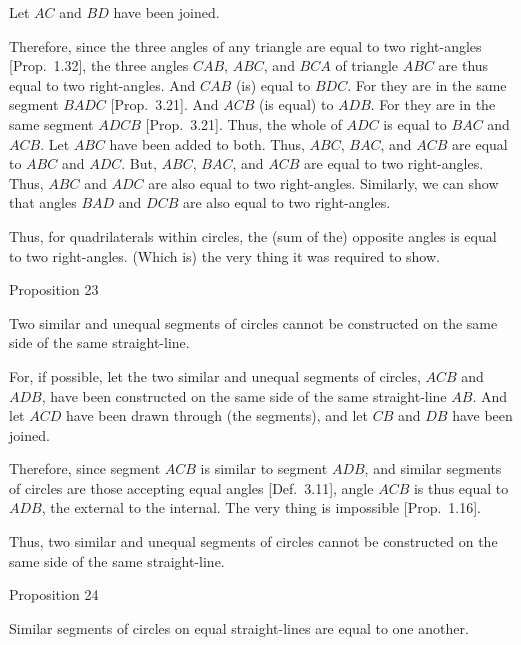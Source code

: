 Let $AC$ and $BD$ have been joined.

Therefore, since the three angles of any triangle are equal to two
right-angles [Prop.~1.32], the
three angles $CAB$, $ABC$, and $BCA$ of triangle $ABC$ are thus equal to two right-angles. And $CAB$ (is) equal to $BDC$. For they are in the
same segment $BADC$ [Prop.~3.21]. And $ACB$ (is equal) to $ADB$.
For they are in the same segment $ADCB$ [Prop.~3.21].
Thus, the whole of $ADC$ is equal to $BAC$ and $ACB$. Let $ABC$ have been added to both. Thus, $ABC$, $BAC$, and
$ACB$ are equal to $ABC$ and $ADC$. But, $ABC$, $BAC$, and $ACB$ are equal to
two right-angles. Thus, $ABC$ and $ADC$ are also equal to two right-angles.
Similarly, we can show that angles $BAD$ and $DCB$ are also equal to
two right-angles.

Thus, for quadrilaterals within circles, the (sum of the) opposite angles is equal to two right-angles. (Which is) the very thing it was required to show.


\begin{center}
{\large Proposition 23}
\end{center}

Two similar and unequal segments of circles cannot be constructed on the same side of the same straight-line.

For, if possible, let the two similar and unequal segments of circles, $ACB$ and
$ADB$, have been constructed on the same side of the same straight-line $AB$. And let $ACD$ have been drawn through (the segments), and let $CB$ and $DB$ have been joined.

\epsfysize=1.25in
\centerline{}

Therefore, since segment $ACB$ is similar to segment $ADB$, and similar segments of circles are those accepting equal angles [Def.~3.11], 
angle $ACB$ is thus equal to $ADB$, the external to the internal. The very thing
is impossible [Prop.~1.16].

Thus,  two similar and unequal segments of circles cannot be constructed on the same side of the same straight-line.


\begin{center}
{\large Proposition 24}
\end{center}

Similar segments of circles on equal straight-lines are equal to one another.

